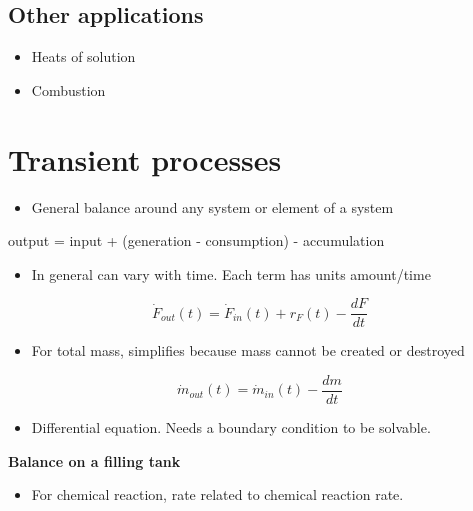 \documentclass[11pt]{article}
\begin{document}
\subsection{Other applications}
\label{sec-11-5}
\begin{itemize}
\item Heats of solution
\item Combustion
\end{itemize}

\section{Transient processes}
\label{sec-12}
\begin{itemize}
\item General balance around any system or element of a system
\end{itemize}

\begin{framed}
output = input + (generation - consumption) - accumulation
\end{framed}

\begin{itemize}
\item In general can vary with time.  Each term has units amount/time
\end{itemize}

\[ \dot{F}_{out}(t) = \dot{F}_{in}(t) + r_{F}(t) - \frac{dF}{dt} \]

\begin{itemize}
\item For total mass, simplifies because mass cannot be created or destroyed
\end{itemize}

\[ \dot{m}_{out}(t) = \dot{m}_{in}(t) - \frac{dm}{dt} \]

\begin{itemize}
\item Differential equation.  Needs a boundary condition to be solvable.
\end{itemize}

\begin{framed}
\noindent \textbf{Balance on a filling tank}
\end{framed}

\begin{itemize}
\item For chemical reaction, rate related to chemical reaction rate.
\end{itemize}
\end{document}
